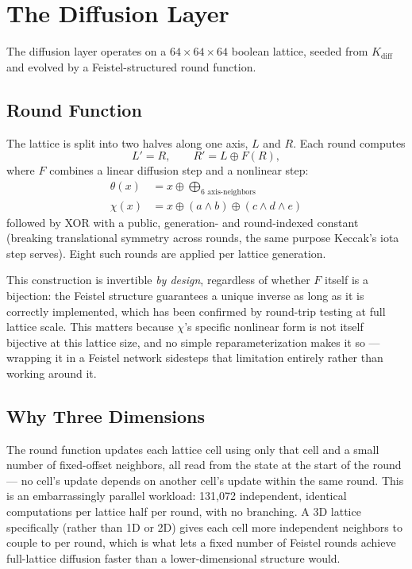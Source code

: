 \documentclass[twocolumn,10pt,journal,compsoc]{IEEEtran}
\begin{document}
\section{The Diffusion Layer}
\label{sec:diffusion}
The diffusion layer operates on a $64\times64\times64$ boolean lattice, seeded from $K_{\text{diff}}$ and evolved by a Feistel-structured round function.

\subsection{Round Function}
The lattice is split into two halves along one axis, $L$ and $R$. Each round computes
\begin{equation}
L' = R, \qquad R' = L \oplus F(R),
\end{equation}
where $F$ combines a linear diffusion step and a nonlinear step:
\begin{align}
\theta(x) &= x \oplus \bigoplus_{\text{6 axis-neighbors}} \\
\chi(x) &= x \oplus (a \wedge b) \oplus (c \wedge d \wedge e)
\end{align}
followed by XOR with a public, generation- and round-indexed constant (breaking translational symmetry across rounds, the same purpose Keccak's iota step serves). Eight such rounds are applied per lattice generation.

This construction is invertible \emph{by design}, regardless of whether $F$ itself is a bijection: the Feistel structure guarantees a unique inverse as long as it is correctly implemented, which has been confirmed by round-trip testing at full lattice scale. This matters because $\chi$'s specific nonlinear form is not itself bijective at this lattice size, and no simple reparameterization makes it so --- wrapping it in a Feistel network sidesteps that limitation entirely rather than working around it.

\subsection{Why Three Dimensions}
\label{sec:diffusion-3d}
The round function updates each lattice cell using only that cell and a small number of fixed-offset neighbors, all read from the state at the start of the round --- no cell's update depends on another cell's update within the same round. This is an embarrassingly parallel workload: 131{,}072 independent, identical computations per lattice half per round, with no branching. A 3D lattice specifically (rather than 1D or 2D) gives each cell more independent neighbors to couple to per round, which is what lets a fixed number of Feistel rounds achieve full-lattice diffusion faster than a lower-dimensional structure would.
\end{document}
